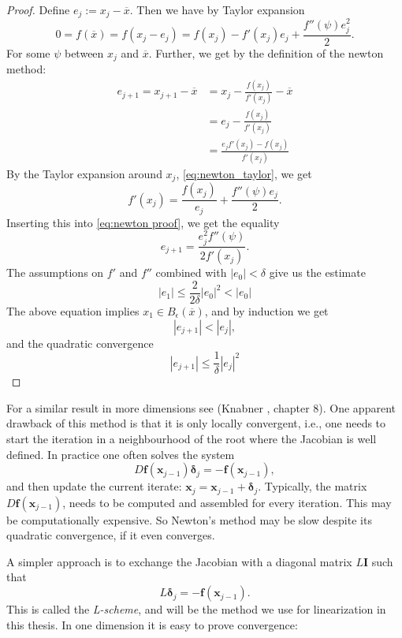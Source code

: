 \documentclass[../Main/main.tex]{subfiles}
\begin{document}
\begin{proof}
	Define $e_j:=x_j-\overline{x}$. Then we have by Taylor expansion
	\begin{equation}\label{eq:newton_taylor}
		0 = f(\overline{x})=f(x_j-e_j) = f(x_j)-f'(x_j)e_j + \frac{f''(\psi)e_j^2}{2}.
	\end{equation}
	For some $\psi$ between $x_j$ and $\overline{x}$. Further, we get by the definition of the newton method:
	\begin{equation}\label{eq:newton proof}
		\begin{aligned}
			e_{j+1} = x_{j+1}-\overline{x} &= x_j-\frac{f(x_j)}{f'(x_j)}-\overline{x}\\
			&=e_j - \frac{f(x_j)}{f'(x_j)}\\ &= \frac{e_j f'(x_j)-f(x_j)}{f'(x_j)}
		\end{aligned}
	\end{equation}
	By the Taylor expansion around $x_j$, \eqref{eq:newton_taylor}, we get
	\begin{equation}
		f'(x_j)=\frac{f(x_j)}{e_j} + \frac{f''(\psi)e_j}{2}.
	\end{equation}
	Inserting this into \eqref{eq:newton proof}, we get the equality
	\begin{equation}
		e_{j+1} = \frac{e_j^2f''(\psi)}{2f'(x_j)}.
	\end{equation}
	The assumptions on $f'$ and  $f''$ combined with $|e_0|<\delta$ give us the estimate
	\begin{equation}
		| e_{1} | \leq \frac{2}{2\delta}|e_0|^2<|e_0|
	\end{equation}
	The above equation implies $x_1\in B_{\epsilon}(\overline{x})$, and by induction we get
	\begin{equation}
		|e_{j+1}|<|e_j|,
	\end{equation}
	and the quadratic convergence
	\begin{equation}
		| e_{j+1} | \leq \frac{1}{\delta}|e_j|^2
	\end{equation}
\end{proof}
For a similar result in more dimensions see (Knabner \cite{Knabner}, chapter 8). One apparent drawback of this method is that it is only locally convergent, i.e., one needs to start the iteration in a neighbourhood of the root where the Jacobian is well defined. In practice one often solves the system
\begin{equation}
	D\bm{f}(\bm{x}_{j-1})\bm{\delta}_{j} = -\bm{f}(\bm{x}_{j-1}),
\end{equation}
and then update the current iterate: $\bm{x}_j = \bm{x}_{j-1} + \bm{\delta}_{j}$. Typically, the matrix $D\bm{f}(\bm{x}_{j-1})$, needs to be computed and assembled for every iteration. This may be computationally expensive. So Newton's method may be slow despite its quadratic convergence, if it even converges.\par 
A simpler approach is to exchange the Jacobian with a diagonal matrix $L\bm{I}$ such that 
\begin{equation}\label{eq:L-scheme}
	L\bm{\delta}_j = - \bm{f}(\bm{x}_{j-1}).
\end{equation}
This is called the \emph{L-scheme}, and will be the  method we use for linearization in this thesis. In one dimension it is easy to prove convergence:
\end{document}
